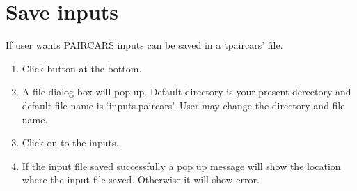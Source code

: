 \documentclass[letterpaper,10pt,english]{sphinxmanual}
\begin{document}
\section{Save inputs}
\label{\detokenize{tut:save-inputs}}
\sphinxAtStartPar
If user wants P\sphinxhyphen{}AIRCARS inputs can be saved in a ‘.paircars’ file.
\begin{enumerate}
%
\item {} 
\sphinxAtStartPar
Click  button at the bottom.

\item {} 
\sphinxAtStartPar
A file dialog box will pop up. Default directory is your present derectory and default file name is ‘inputs.paircars’. User may change the directory and file name.

\item {} 
\sphinxAtStartPar
Click on  to the inputs.

\item {} 
\sphinxAtStartPar
If the input file saved successfully a pop up message will show the location where the input file saved. Otherwise it will show error.

\end{enumerate}
\end{document}
